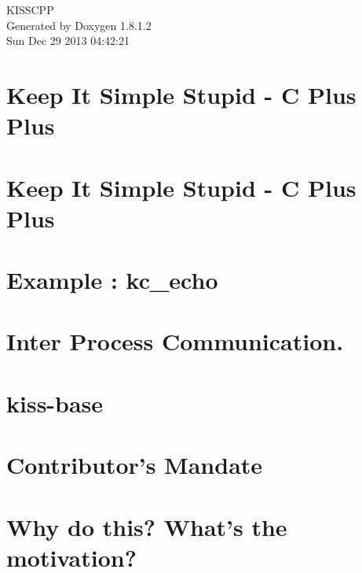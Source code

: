 \documentclass{book}
\begin{document}
\hypersetup{pageanchor=false,citecolor=blue}
\begin{titlepage}
\vspace*{7cm}
\begin{center}
{\Large K\-I\-S\-S\-C\-P\-P }\\
\vspace*{1cm}
{\large Generated by Doxygen 1.8.1.2}\\
\vspace*{0.5cm}
{\small Sun Dec 29 2013 04:42:21}\\
\end{center}
\end{titlepage}
\clearemptydoublepage
{}
\tableofcontents
\clearemptydoublepage
{}
\hypersetup{pageanchor=true,citecolor=blue}
\chapter{Keep It Simple Stupid -\/ C Plus Plus}
\label{index}\hypertarget{index}{}
\chapter{Keep It Simple Stupid -\/ C Plus Plus}
\label{md_README}
\hypertarget{md_README}{}

\chapter{Example \-: kc\-\_\-echo}
\label{md_example_echo}
\hypertarget{md_example_echo}{}

\chapter{Inter Process Communication.}
\label{md_inter_process_communication}
\hypertarget{md_inter_process_communication}{}

\chapter{kiss-\/base}
\label{md_kiss-base}
\hypertarget{md_kiss-base}{}

\chapter{Contributor's Mandate}
\label{md_mandate}
\hypertarget{md_mandate}{}

\chapter{Why do this? What's the motivation?}
\label{md_motivation}
\hypertarget{md_motivation}{}

\end{document}
